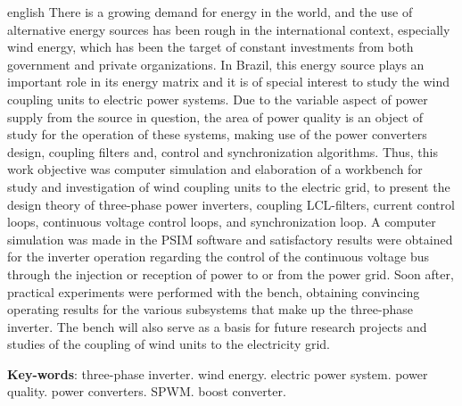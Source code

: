 \begin{resumo}[Abstract]
 \begin{otherlanguage*}{english}
  There is a growing demand for energy in the world, and the use of alternative energy sources has been rough in the international context, especially wind energy, which has been the target of constant investments from both government and private organizations.
  In Brazil, this energy source plays an important role in its energy matrix and it is of special interest to study the wind coupling units to electric power systems.
  Due to the variable aspect of power supply from the source in question, the area of power quality is an object of study for the operation of these systems, making use of the power converters design, coupling filters and, control and synchronization algorithms.
  Thus, this work objective was computer simulation and elaboration of a workbench for study and investigation of wind coupling units to the electric grid, to present the design theory of three-phase power inverters, coupling LCL-filters, current control loops, continuous voltage control loops, and synchronization loop.
  A computer simulation was made in the PSIM software and satisfactory results were obtained for the inverter operation regarding the control of the continuous voltage bus through the injection or reception of power to or from the power grid.
  Soon after, practical experiments were performed with the bench, obtaining convincing operating results for the various subsystems that make up the three-phase inverter. The bench will also serve as a basis for future research projects and studies of the coupling of wind units to the electricity grid.

   \vspace{\onelineskip}
 
   \noindent 
   \textbf{Key-words}: three-phase inverter. wind energy. electric power system. power quality. power converters. SPWM. boost converter.
 \end{otherlanguage*}
\end{resumo}
